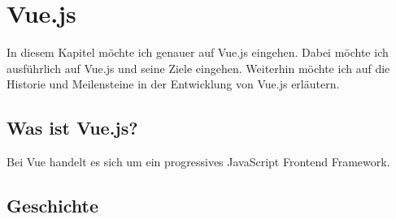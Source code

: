 
\chapter{Vue.js}
In diesem Kapitel möchte ich genauer auf Vue.js eingehen.
Dabei möchte ich ausführlich auf Vue.js und seine Ziele eingehen.
Weiterhin möchte ich auf die Historie und Meilensteine in der Entwicklung von Vue.js erläutern.


\section{Was ist Vue.js?}
Bei Vue handelt es sich um ein progressives JavaScript Frontend Framework.

\section{Geschichte}